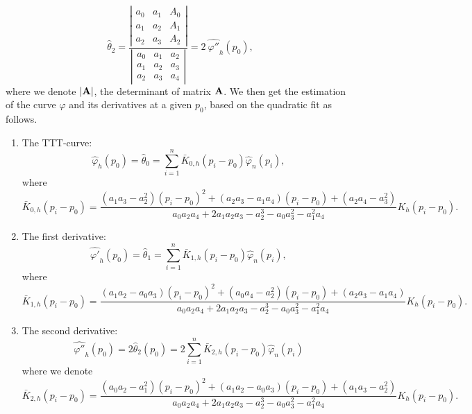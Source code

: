 \documentclass[preprint,12pt]{elsarticle}
\begin{document}
\[
\widehat{\theta}_2=\frac{\left|
\begin{array}{ccc} 
a_0 & a_1 & A_0 \\
 a_1 & a_2 &A_1 \\ 
a_2 & a_3 &A_2
 \end{array}\right|}
{\left|\begin{array}{ccc}
a_0 & a_1 &a_2 \\
 a_1 & a_2 &a_3 \\ 
a_2 & a_3 &a_4
 \end{array}\right|}=2 \ \widehat{\varphi''}_h(p_0),
\]
where we denote $|{\bf A}|$, the determinant of matrix ${\bf A}$. We then get the estimation of the curve $\varphi$ and its derivatives at a given $p_0$, based on the quadratic fit as follows.
\begin{enumerate}
\item The TTT-curve:
\begin{equation}\label{theta0}
\widehat{\varphi}_{h}(p_0)=\widehat{\theta}_0= \sum_{i=1}^n \bar{{K}}_{0,h}\left(p_i-p_0\right) \widehat{\varphi}_n(p_i),
\end{equation}
where
\[
\bar{{K}}_{0,h}\left(p_i-p_0\right)=\frac{\left(a_1a_3-a_2^2\right)\left(p_i-p_0\right)^2+\left(a_2a_3-a_1a_4\right)\left(p_i-p_0\right)+\left(a_2a_4-a_3^2\right)}{a_0a_2a_4+2a_1a_2a_3-a_2^3-a_0a_3^2-a_1^2a_4} K_h\left(p_i-p_0\right).
\]

\item The first derivative:
\begin{equation}\label{theta1}
\widehat{\varphi'}_{h}(p_0)=\widehat{\theta}_1= \sum_{i=1}^n \bar{{K}}_{1,h}\left(p_i-p_0\right) \widehat{\varphi}_n(p_i),
\end{equation}
where
\[
\bar{{K}}_{1,h}\left(p_i-p_0\right)=\frac{\left(a_1a_2-a_0a_3\right)\left(p_i-p_0\right)^2+\left(a_0a_4-a_2^2\right)\left(p_i-p_0\right)+\left(a_2a_3-a_1a_4\right)}{a_0a_2a_4+2a_1a_2a_3-a_2^3-a_0a_3^2-a_1^2a_4} K_h\left(p_i-p_0\right).
\]

\item  The second derivative: 
\begin{equation}\label{theta2}
\widehat{\varphi''}_h(p_0)=2 \widehat{\theta}_2(p_0) =2 \sum_{i=1}^n \bar{{K}}_{2,h}\left(p_i-p_0\right) \widehat{\varphi}_n(p_i)
\end{equation}
where we denote
\[
\bar{{K}}_{2,h}\left(p_i-p_0\right)=\frac{\left(a_0a_2-a_1^2\right)\left(p_i-p_0\right)^2+\left(a_1a_2-a_0a_3\right)\left(p_i-p_0\right)+\left(a_1a_3-a_2^2\right)}{a_0a_2a_4+2a_1a_2a_3-a_2^3-a_0a_3^2-a_1^2a_4} K_h\left(p_i-p_0\right).
\]
\end{enumerate}
\bigskip
\end{document}
